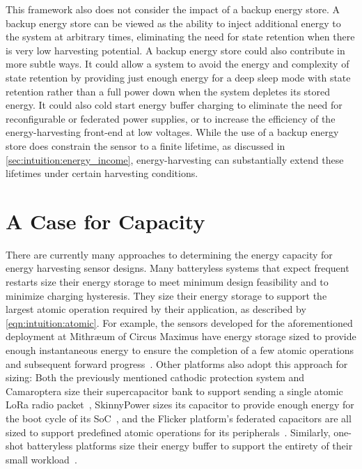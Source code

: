 This framework also does not consider the impact of a backup energy store.
A backup energy store can be viewed as the ability to inject additional energy
to the system at arbitrary times,
eliminating the need for state retention when there is very low
harvesting potential.
A backup energy store could also contribute in more subtle ways. It could
allow a system to avoid the energy and complexity of state retention by
providing just enough energy for a deep sleep mode with state retention rather
than a full power down when the system depletes its stored energy. It could also
cold start energy buffer charging to eliminate the need for reconfigurable
or federated power supplies, or to increase the efficiency of
the energy-harvesting front-end at low voltages.
While the use of a backup energy store
does constrain the sensor to a finite lifetime,
as discussed in \cref{sec:intuition:energy_income}, energy-harvesting can substantially extend these lifetimes under certain harvesting
conditions.

\section{A Case for Capacity}
\label{sec:intuition:capacity}
There are currently many approaches to determining the energy capacity for energy harvesting sensor designs.
Many batteryless systems that expect frequent restarts size their energy storage to meet minimum design feasibility and to minimize charging hysteresis.
They size their energy storage to support the largest atomic operation required by their application, as described by
\cref{eqn:intuition:atomic}.
For example, the sensors developed for the aforementioned deployment at Mithræum of Circus Maximus have energy storage sized to provide enough instantaneous energy to ensure the completion of a few atomic operations and subsequent forward progress~\cite{afanasov2020battery}. Other platforms also adopt this approach for sizing: Both the previously mentioned cathodic protection system and Camaroptera size their supercapacitor bank to support sending a single atomic LoRa radio packet~\cite{nardello2019camaroptera,jagtap2021repurposing},  SkinnyPower sizes its capacitor to provide enough energy for the boot cycle of its SoC~\cite{shukla2019skinnypower}, and the Flicker platform's federated capacitors are all sized to support predefined atomic operations for its peripherals~\cite{hesterFlicker17}.
Similarly, one-shot batteryless platforms size their energy buffer to support the entirety of their small workload~\cite{yervaGrafting12,debruin2013monjolo,campbellEnergy14,campbellThermes14}.

